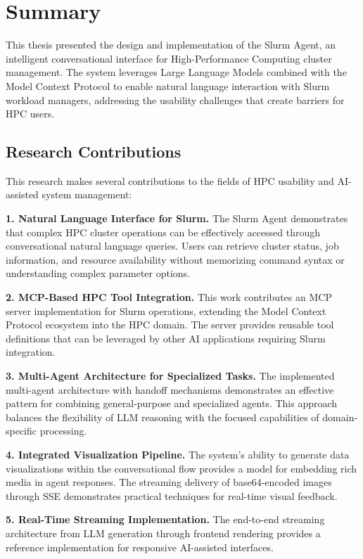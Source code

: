 \section{Summary}
\label{sec:summary}

This thesis presented the design and implementation of the Slurm Agent, an intelligent conversational interface for High-Performance Computing cluster management. The system leverages Large Language Models combined with the Model Context Protocol to enable natural language interaction with Slurm workload managers, addressing the usability challenges that create barriers for HPC users.

\subsection{Research Contributions}

This research makes several contributions to the fields of HPC usability and AI-assisted system management:

\textbf{1. Natural Language Interface for Slurm.} The Slurm Agent demonstrates that complex HPC cluster operations can be effectively accessed through conversational natural language queries. Users can retrieve cluster status, job information, and resource availability without memorizing command syntax or understanding complex parameter options.

\textbf{2. MCP-Based HPC Tool Integration.} This work contributes an MCP server implementation for Slurm operations, extending the Model Context Protocol ecosystem into the HPC domain. The server provides reusable tool definitions that can be leveraged by other AI applications requiring Slurm integration.

\textbf{3. Multi-Agent Architecture for Specialized Tasks.} The implemented multi-agent architecture with handoff mechanisms demonstrates an effective pattern for combining general-purpose and specialized agents. This approach balances the flexibility of LLM reasoning with the focused capabilities of domain-specific processing.

\textbf{4. Integrated Visualization Pipeline.} The system's ability to generate data visualizations within the conversational flow provides a model for embedding rich media in agent responses. The streaming delivery of base64-encoded images through SSE demonstrates practical techniques for real-time visual feedback.

\textbf{5. Real-Time Streaming Implementation.} The end-to-end streaming architecture from LLM generation through frontend rendering provides a reference implementation for responsive AI-assisted interfaces.


